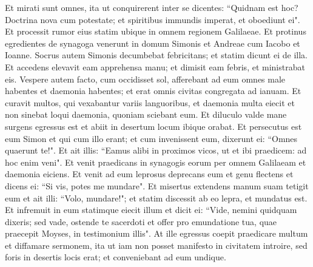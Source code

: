 \begin{biblechapter}
\verse Et mirati sunt omnes, ita ut conquirerent inter se dicentes: “Quidnam est hoc? Doctrina nova cum potestate; et spiritibus immundis imperat, et oboediunt ei". 
\verse Et processit rumor eius statim ubique in omnem regionem Galilaeae. 
\verse Et protinus egredientes de synagoga venerunt in domum Simonis et Andreae cum Iacobo et Ioanne. 
\verse Socrus autem Simonis decumbebat febricitans; et statim dicunt ei de illa. 
\verse Et accedens elevavit eam apprehensa manu; et dimisit eam febris, et ministrabat eis. 
\verse Vespere autem facto, cum occidisset sol, afferebant ad eum omnes male habentes et daemonia habentes; 
\verse et erat omnis civitas congregata ad ianuam. 
\verse Et curavit multos, qui vexabantur variis languoribus, et daemonia multa eiecit et non sinebat loqui daemonia, quoniam sciebant eum. 
\verse Et diluculo valde mane surgens egressus est et abiit in desertum locum ibique orabat. 
\verse Et persecutus est eum Simon et qui cum illo erant; 
\verse et cum invenissent eum, dixerunt ei: “Omnes quaerunt te!". 
\verse Et ait illis: “Eamus alibi in proximos vicos, ut et ibi praedicem: ad hoc enim veni". 
\verse Et venit praedicans in synagogis eorum per omnem Galilaeam et daemonia eiciens. 
\verse Et venit ad eum leprosus deprecans eum et genu flectens et dicens ei: “Si vis, potes me mundare". 
\verse Et misertus extendens manum suam tetigit eum et ait illi: “Volo, mundare!"; 
\verse et statim discessit ab eo lepra, et mundatus est. 
\verse Et infremuit in eum statimque eiecit illum 
\verse et dicit ei: “Vide, nemini quidquam dixeris; sed vade, ostende te sacerdoti et offer pro emundatione tua, quae praecepit Moyses, in testimonium illis". 
\verse At ille egressus coepit praedicare multum et diffamare sermonem, ita ut iam non posset manifesto in civitatem introire, sed foris in desertis locis erat; et conveniebant ad eum undique. 
\end{biblechapter}

